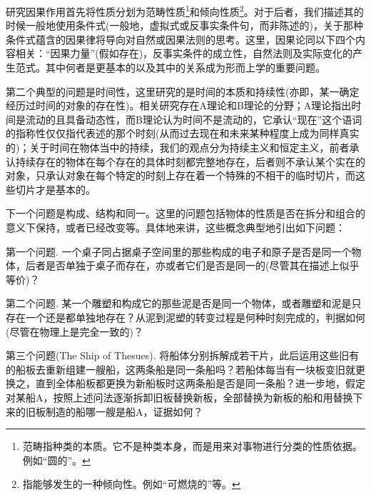 \documentclass{article}
\begin{document}
研究因果作用首先将性质分划为范畴性质\footnote{范畴指种类的本质。它不是种类本身，而是用来对事物进行分类的性质依据。例如“圆的”。}和倾向性质\footnote{指能够发生的一种倾向性。例如“可燃烧的”等。}。对于后者，我们描述其的时候一般地使用条件式(一般地，虚拟式或反事实条件句，而非陈述的)，关于那种条件式蕴含的因果律将导向对自然或因果法则的思考。这里，因果论同以下四个内容相关：“因果力量”(假如存在)，反事实条件的成立性，自然法则及实际变化的产生范式。其中何者是更基本的以及其中的关系成为形而上学的重要问题。

第二个典型的问题是时间性，这里研究的是时间的本质和持续性(亦即，某一确定经历过时间的对象的存在性)。相关研究存在A理论和B理论的分野；A理论指出时间是流动的且具备动态性，而B理论认为时间不是流动的，它承认“现在”这个语词的指称性仅仅指代表述的那个时刻(从而过去现在和未来某种程度上成为同样真实的)；关于时间在物体当中的持续，我们的观点分为持续主义和恒定主义，前者承认持续存在的物体在每个存在的具体时刻都完整地存在，后者则不承认某个实在的对象，只承认对象在每个特定的时刻上存在着一个特殊的不相干的临时切片，而这些切片才是基本的。

下一个问题是构成、结构和同一。这里的问题包括物体的性质是否在拆分和组合的意义下保持，或者已经改变等。具体地来讲，这些概念典型地引出如下问题：

{\kaishu 第一个问题.}
一个桌子同占据桌子空间里的那些构成的电子和原子是否是同一个物体，后者是否单独于桌子而存在，亦或者它们是否是同一的(尽管其在描述上似乎等价)？

{\kaishu 第二个问题.}
某一个雕塑和构成它的那些泥是否是同一个物体，或者雕塑和泥是只存在一个还是都单独地存在？从泥到泥塑的转变过程是何种时刻完成的，判据如何(尽管在物理上是完全一致的)？

{\kaishu 第三个问题(The Ship of Thesues).}
将船体分别拆解成若干片，此后运用这些旧有的船板去重新组建一艘船，这两条船是同一条船吗？若船体每当有一块板变旧就更换之，直到全体船板都更换为新船板时这两条船是否是同一条船？进一步地，假定对某船A，按照上述问法逐渐拆卸旧板替换新板，全部替换为新板的船和用替换下来的旧板制造的船哪一艘是船A，证据如何？
\end{document}
